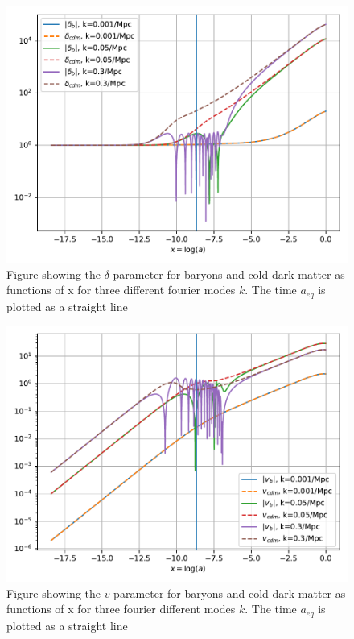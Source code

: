 \documentclass[onecolumn]{aastex62}
\begin{document}
\begin{figure}
    \includegraphics[scale=0.8]{figures/delta.pdf}
    \caption{Figure showing the $\delta$ parameter for baryons and cold dark matter as functions of x for three different fourier modes $k$. The time $a_{eq}$ is plotted as a straight line}
    \label{fig:delta}
\end{figure}

\begin{figure}
    \includegraphics[scale=0.8]{figures/v.pdf}
    \caption{Figure showing the $v$ parameter for baryons and cold dark matter as functions of x for three fourier different modes $k$. The time $a_{eq}$ is plotted as a straight line}
    \label{fig:v}
\end{figure}
\end{document}
